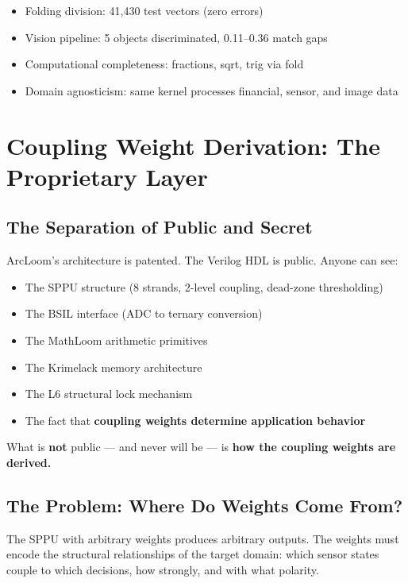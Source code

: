 \documentclass[11pt,a4paper]{article}
\begin{document}
\begin{itemize}
    \item Folding division: 41,430 test vectors (zero errors)
    \item Vision pipeline: 5 objects discriminated, 0.11--0.36 match gaps
    \item Computational completeness: fractions, sqrt, trig via fold
    \item Domain agnosticism: same kernel processes financial, sensor, and image data
\end{itemize}

\section{Coupling Weight Derivation: The Proprietary Layer}

\subsection{The Separation of Public and Secret}

ArcLoom's architecture is patented. The Verilog HDL is public. Anyone can see:
\begin{itemize}
    \item The SPPU structure (8 strands, 2-level coupling, dead-zone thresholding)
    \item The BSIL interface (ADC to ternary conversion)
    \item The MathLoom arithmetic primitives
    \item The Krimelack memory architecture
    \item The L6 structural lock mechanism
    \item The fact that \textbf{coupling weights determine application behavior}
\end{itemize}

What is \textbf{not} public --- and never will be --- is \textbf{how the coupling weights are derived.}

\subsection{The Problem: Where Do Weights Come From?}

The SPPU with arbitrary weights produces arbitrary outputs. The weights must encode the structural relationships of the target domain: which sensor states couple to which decisions, how strongly, and with what polarity.
\end{document}

